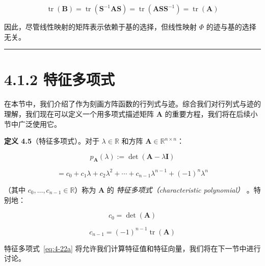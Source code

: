 \begin{equation}
\operatorname{tr}(\boldsymbol{B}) = \operatorname{tr}(\boldsymbol{S}^{-1}\boldsymbol{A}\boldsymbol{S}) = \operatorname{tr}(\boldsymbol{A}\boldsymbol{S}\boldsymbol{S}^{-1}) = \operatorname{tr}(\boldsymbol{A})
\tag{4.21}\label{eq:4-21}
\end{equation}

因此，尽管线性映射的矩阵表示依赖于基的选择，但线性映射 $ \Phi $ 的迹与基的选择无关。

\medskip\hrule\medskip

\section*{4.1.2 特征多项式}

在本节中，我们介绍了作为刻画方阵函数的行列式与迹。综合我们对行列式与迹的理解，我们现在可以定义一个用多项式描述矩阵 $ \boldsymbol{A} $ 的重要方程，我们将在后续小节中广泛使用它。

\textbf{定义 4.5}（特征多项式）。对于 $ \lambda \in \mathbb{R} $ 和方阵 $ \boldsymbol{A} \in \mathbb{R}^{n \times n} $：

\begin{equation}
p_{\boldsymbol{A}}(\lambda) := \det(\boldsymbol{A} - \lambda \boldsymbol{I})
\tag{4.22a}\label{eq:4-22a}
\end{equation}

\begin{equation}
= c_0 + c_1\lambda + c_2\lambda^2 + \cdots + c_{n-1}\lambda^{n-1} + (-1)^n\lambda^n
\tag{4.22b}\label{eq:4-22b}
\end{equation}

（其中 $ c_0, \ldots, c_{n-1} \in \mathbb{R} $）称为 $ \boldsymbol{A} $ 的 \emph{特征多项式（characteristic polynomial）} 。特别地：

\begin{equation}
c_0 = \det(\boldsymbol{A})
\tag{4.23}\label{eq:4-23}
\end{equation}

\begin{equation}
c_{n-1} = (-1)^{n-1}\operatorname{tr}(\boldsymbol{A})
\tag{4.24}\label{eq:4-24}
\end{equation}

特征多项式~\eqref{eq:4-22a} 将允许我们计算特征值和特征向量，我们将在下一节中进行讨论。
